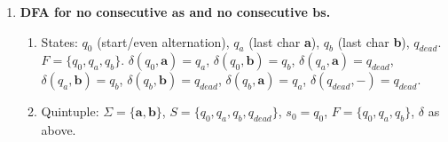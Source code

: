 \documentclass[11pt]{book}
\begin{document}
\begin{enumerate}[{1.}1.]
Two states track whether there is an outstanding \textbf{b} with no subsequent \textbf{c}:
$q_0$ (no unresolved \textbf{b}), $q_b$ (at least one unresolved \textbf{b}). $F=\{q_0\}$.
\[
\delta(q_0,\mathbf{a})=q_0,\quad\delta(q_0,\mathbf{b})=q_b,\quad\delta(q_0,\mathbf{c})=q_0,
\]
\[
\delta(q_b,\mathbf{a})=q_b,\quad\delta(q_b,\mathbf{b})=q_b,\quad\delta(q_b,\mathbf{c})=q_0.
\]
Reading \textbf{c} in $q_b$ resolves all pending \textbf{b}s; \textbf{a} or \textbf{b} keeps them pending.
Accept iff input ends in $q_0$.

\item \textbf{DFA for no consecutive $\mathbf{a}$s and no consecutive $\mathbf{b}$s.}

\begin{enumerate}
\item States: $q_0$ (start/even alternation), $q_a$ (last char \textbf{a}), $q_b$ (last char \textbf{b}), $q_{dead}$. $F=\{q_0,q_a,q_b\}$.
$\delta(q_0,\mathbf{a})=q_a$, $\delta(q_0,\mathbf{b})=q_b$,
$\delta(q_a,\mathbf{a})=q_{dead}$, $\delta(q_a,\mathbf{b})=q_b$,
$\delta(q_b,\mathbf{b})=q_{dead}$, $\delta(q_b,\mathbf{a})=q_a$,
$\delta(q_{dead},-)=q_{dead}$.

\item Quintuple: $\Sigma=\{\mathbf{a},\mathbf{b}\}$, $S=\{q_0,q_a,q_b,q_{dead}\}$, $s_0=q_0$, $F=\{q_0,q_a,q_b\}$, $\delta$ as above.
\end{enumerate}

\end{enumerate}













\end{document}
